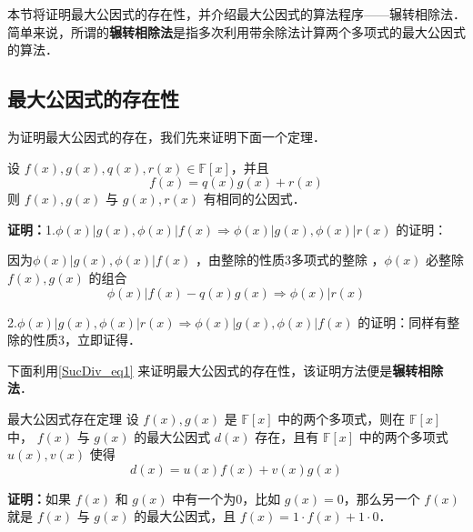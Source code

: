 
\begin{issues}
\end{issues}

本节将证明最大公因式的存在性，并介绍最大公因式的算法程序——辗转相除法．简单来说，所谓的\textbf{辗转相除法}是指多次利用带余除法计算两个多项式的最大公因式的算法．
\subsection{最大公因式的存在性}
为证明最大公因式的存在，我们先来证明下面一个定理．
\begin{theorem}{}\label{SucDiv_the1}
设 $f(x),g(x),q(x),r(x)\in\mathbb{F}[x]$，并且
\begin{equation}\label{SucDiv_eq1}
f(x)=q(x)g(x)+r(x)
\end{equation}
则 $f(x),g(x)$ 与 $g(x),r(x)$ 有相同的公因式．
\end{theorem}
\textbf{证明：}1.$\phi(x)|g(x),\phi(x)|f(x)\Rightarrow \phi(x)|g(x),\phi(x)|r(x)$ 的证明：

因为$\phi(x)|g(x),\phi(x)|f(x)$ ，由整除的性质3多项式的整除 ，$\phi(x)$ 必整除 $f(x),g(x)$ 的组合
\begin{equation}
\phi(x)|f(x)-q(x)g(x)\Rightarrow \phi(x)|r(x)
\end{equation}

2.$\phi(x)|g(x),\phi(x)|r(x)\Rightarrow\phi(x)|g(x),\phi(x)|f(x)$ 的证明：同样有整除的性质3，立即证得．

下面利用\autoref{SucDiv_eq1} 来证明最大公因式的存在性，该证明方法便是\textbf{辗转相除法}．
\begin{theorem}{最大公因式存在定理}
设 $f(x),g(x)$ 是 $\mathbb{F}[x]$ 中的两个多项式，则在 $\mathbb{F}[x]$ 中， $f(x)$ 与 $g(x)$ 的最大公因式 $d(x)$ 存在，且有 $\mathbb{F}[x]$ 中的两个多项式 $u(x),v(x)$ 使得
\begin{equation}\label{SucDiv_eq2}
d(x)=u(x)f(x)+v(x)g(x)
\end{equation}

\end{theorem}
\textbf{证明：}如果 $f(x)$ 和 $g(x)$ 中有一个为0，比如 $g(x)=0$，那么另一个 $f(x)$ 就是 $f(x)$ 与 $g(x)$ 的最大公因式，且 $f(x)=1\cdot f(x)+1\cdot0$．

